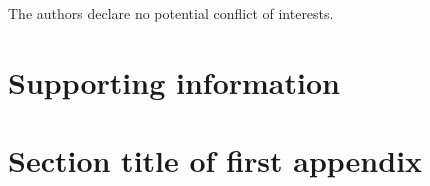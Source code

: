 \documentclass[AMA,STIX1COL]{WileyNJD-v2}
\begin{document}
The authors declare no potential conflict of interests.


\section*{Supporting information}

%
%


\appendix

\section{Section title of first appendix\label{app1}}

%
%
%
%
%
%
%
%
%
\end{document}
